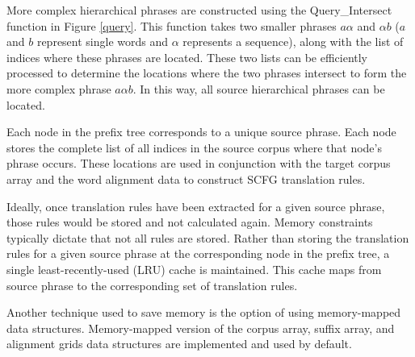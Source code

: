 \documentclass{pbml}
\begin{document}
More complex hierarchical phrases are constructed using the {\sc Query\_Intersect} function in Figure \ref{query}. This function takes two smaller phrases $a\alpha$ and $\alpha{}b$ ($a$ and $b$ represent single words and $\alpha$ represents a sequence), along with the list of indices where these phrases are located. These two lists can be efficiently processed to determine the locations where the two phrases intersect to form the more complex phrase $a\alpha{}b$. In this way, all source hierarchical phrases can be located.

Each node in the prefix tree corresponds to a unique source phrase. Each node stores the complete list of all indices in the source corpus where that node's phrase occurs. These locations are used in conjunction with the target corpus array and the word alignment data to construct SCFG translation rules.

Ideally, once translation rules have been extracted for a given source phrase, those rules would be stored and not calculated again. Memory constraints typically dictate that not all rules are stored. Rather than storing the translation rules for a given source phrase at the corresponding node in the prefix tree, a single least-recently-used (LRU) cache is maintained. This cache maps from source phrase to the corresponding set of translation rules. 

Another technique used to save memory is the option of using memory-mapped data structures. Memory-mapped version of the corpus array, suffix array, and alignment grids data structures are implemented and used by default.






\end{document}
